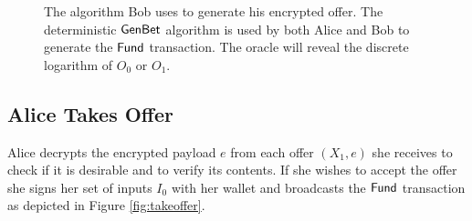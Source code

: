\documentclass[runningheads]{llncs}
\begin{document}
\begin{figure}[!h]
  \centering
 \caption{The algorithm Bob uses to generate his encrypted offer. The deterministic $\textsf{GenBet}$ algorithm is used by both Alice and Bob to generate the $\textsf{Fund}$ transaction. The oracle will reveal the discrete logarithm of $O_0$ or $O_1$.}
 \label{fig:offer-alg}
\end{figure}

\subsection{Alice Takes Offer}

Alice decrypts the encrypted payload $e$ from each offer $(X_1, e)$ she receives to check if it is desirable and to verify its contents. If she wishes to accept the offer she signs her set of inputs $I_0$ with her wallet and broadcasts the $\textsf{Fund}$ transaction as depicted in Figure \ref{fig:takeoffer}.
\end{document}
